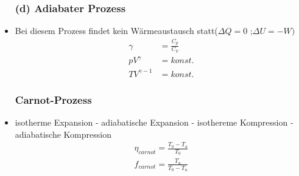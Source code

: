 \documentclass[10pt,a4paper]{article}
\begin{document}
\begin{itemize}
\subsubsection{(d) Adiabater Prozess}
\item Bei diesem Prozess findet kein Wärmeaustausch statt($\Delta Q=0$ ;$\Delta U=-W)$
\begin{align}
\gamma &= \frac{C_p}{C_V} \\
pV^\gamma &= konst. \\
TV^{\gamma-1}&=konst.
\end{align}
\subsubsection {Carnot-Prozess}
\item isotherme Expansion - adiabatische Expansion - isothereme Kompression - adiabatische Kompression
\begin{align}
\eta_{carnot} =\frac{T_0-T_u}{T_0} \\
f_{carnot} = \frac{T_u}{T_0-T_u}
\end{align}
\end{itemize}
\end{document}
